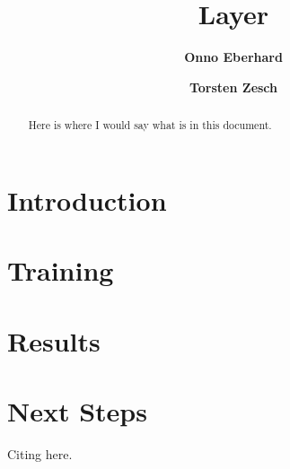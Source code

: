 \documentclass[12pt]{article}    %
\title{Layer }
\author[1]{\textbf{Onno Eberhard}}
\author[ ]{\textbf{Torsten Zesch}}
\affil[ ]{Language Technology Lab}
\affil[ ]{University of Duisburg-Essen}
\affil[1]{\texttt{onnoeberhard@gmail.com}}
\begin{document}
\maketitle

\begin{abstract}
Here is where I would say what is in this document.
\end{abstract}

\section{Introduction}
\cite{agarwal-zesch-2019-german}

\section{Training}
\cite{Radeck-Arneth2015}
\cite{heafield-2011-kenlm}

\section{Results}


\section{Next Steps}

Citing \cite{agarwal-zesch-2019-german} here.

\printbibliography
\end{document}
